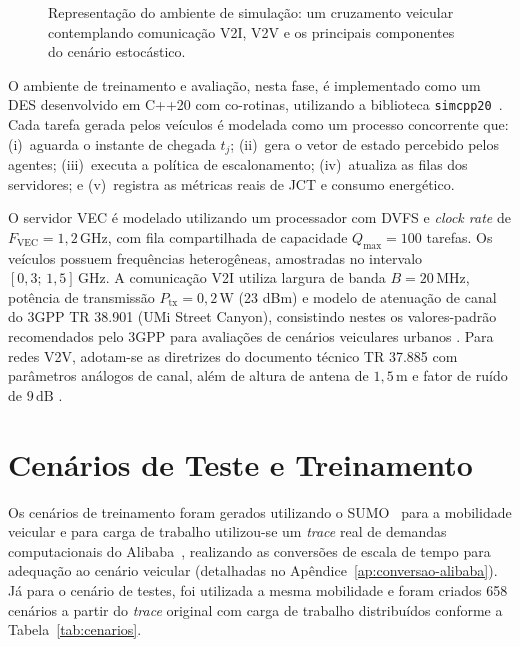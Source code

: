 \begin{figure}[htb]
{%
    }
    \caption{Representação do ambiente de simulação: um cruzamento veicular contemplando comunicação \gls{V2I}, \gls{V2V} e os principais componentes do cenário estocástico.}
    \label{fig:ambiente_simulacao}
\end{figure}

O ambiente de treinamento e avaliação, nesta fase, é implementado como um \gls{DES} desenvolvido em C++20 com co-rotinas, utilizando a biblioteca \texttt{simcpp20}~\cite{simcpp20}. Cada tarefa gerada pelos veículos é modelada como um processo concorrente que: (i)~aguarda o instante de chegada $t_j$; (ii)~gera o vetor de estado percebido pelos agentes; (iii)~executa a política de escalonamento; (iv)~atualiza as filas dos servidores; e (v)~registra as métricas reais de \gls{JCT} e consumo energético.

O servidor \gls{VEC} é modelado utilizando um processador com \gls{DVFS} e \textit{clock rate} de $F_{\text{VEC}} = 1{,}2\,\text{GHz}$, com fila compartilhada de capacidade $Q_{\max} = 100$ tarefas. Os veículos possuem frequências heterogêneas, amostradas no intervalo $[0{,}3;\,1{,}5]\,\text{GHz}$. A comunicação \gls{V2I} utiliza largura de banda $B = 20\,\text{MHz}$, potência de transmissão $P_{\text{tx}} = 0{,}2\,\text{W}$ (23 dBm) e modelo de atenuação de canal do \gls{3GPP} TR 38.901 (UMi Street Canyon), consistindo nestes os valores-padrão recomendados pelo \gls{3GPP} para avaliações de cenários veiculares urbanos \cite{3gpp38901}. Para redes \gls{V2V}, adotam-se as diretrizes do documento técnico TR 37.885 com parâmetros análogos de canal, além de altura de antena de $1{,}5\,\text{m}$ e fator de ruído de $9\,\text{dB}$ \cite{3gpp_tr37885}.

\section{Cenários de Teste e Treinamento}
\label{sec:cenarios}

Os cenários de treinamento foram gerados utilizando o SUMO~\cite{lopez2018microscopic} para a mobilidade veicular e para carga de trabalho utilizou-se um \textit{trace} real de demandas computacionais do Alibaba~\cite{cheng2018characterizing}, realizando as conversões de escala de tempo para adequação ao cenário veicular (detalhadas no Apêndice~\ref{ap:conversao-alibaba}). Já para o cenário de testes, foi utilizada a mesma mobilidade e foram criados 658 cenários a partir do \textit{trace} original com carga de trabalho distribuídos conforme a Tabela~\ref{tab:cenarios}.

